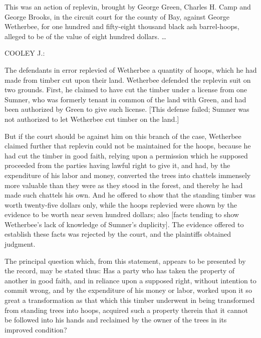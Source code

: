 
This was an action of replevin, brought by George Green, Charles H. Camp and
George Brooks, in the circuit court for the county of Bay, against George
Wetherbee, for one hundred and fifty-eight thousand black ash barrel-hoops,
alleged to be of the value of eight hundred dollars. \ldots

COOLEY J.:

The defendants in error replevied of Wetherbee a quantity of hoops, which he had
made from timber cut upon their land. Wetherbee defended the replevin suit on
two grounds. First, he claimed to have cut the timber under a license from one
Sumner, who was formerly tenant in common of the land with Green, and had been
authorized by Green to give such license. [This defense failed; Sumner was not
authorized to let Wetherbee cut timber on the land.]

But if the court should be against him on this branch of the case, Wetherbee
claimed further that replevin could not be maintained for the hoops, because he
had cut the timber in good faith, relying upon a permission which he supposed
proceeded from the parties having lawful right to give it, and had, by the
expenditure of his labor and money, converted the trees into chattels immensely
more valuable than they were as they stood in the forest, and thereby he had
made such chattels his own. And he offered to show that the standing timber was
worth twenty-five dollars only, while the hoops replevied were shown by the
evidence to be worth near seven hundred dollars; also [facts tending to show
Wetherbee's lack of knowledge of Sumner's duplicity]. The evidence offered to
establish these facts was rejected by the court, and the plaintiffs obtained
judgment.

The principal question which, from this statement, appears to be presented by
the record, may be stated thus: Has a party who has taken the property of
another in good faith, and in reliance upon a supposed right, without intention
to commit wrong, and by the expenditure of his money or labor, worked upon it
so great a transformation as that which this timber underwent in being
transformed from standing trees into hoops, acquired such a property therein
that it cannot be followed into his hands and reclaimed by the owner of the
trees in its improved condition?

